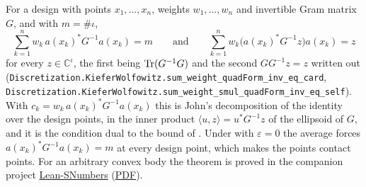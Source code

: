 \begin{remark}
\label{rem:identity-decomposition}
\leanok
{}
For a design with points $x_1, \dots, x_n$, weights $w_1, \dots, w_n$ and invertible Gram
matrix $G$, and with $m = \#\iota$,
\[
  \sum_{k=1}^n w_k \, a(x_k)^* G^{-1} a(x_k) = m
  \qquad \text{and} \qquad
  \sum_{k=1}^n w_k \bigl( a(x_k)^* G^{-1} z \bigr) a(x_k) = z
\]
for every $z \in \mathbb{C}^{\iota}$, the first being $\operatorname{Tr}(G^{-1} G)$ and the second
$G G^{-1} z = z$ written out
(\texttt{Discretization.KieferWolfowitz.sum\_weight\_quadForm\_inv\_eq\_card},
\texttt{Discretization.KieferWolfowitz.sum\_weight\_smul\_quadForm\_inv\_eq\_self}). With $c_k = w_k \, a(x_k)^* G^{-1} a(x_k)$ this is John's
decomposition of the identity over the design points, in the inner product
$\langle u, z \rangle = u^* G^{-1} z$ of the ellipsoid of $G$, and it is the condition
dual to the bound of . Under
 with $\varepsilon = 0$ the average forces
$a(x_k)^* G^{-1} a(x_k) = m$ at every design point, which makes the points contact
points. For an arbitrary convex body the theorem is proved in the companion project
\href{https://mario-ullrich.github.io/Lean-SNumbers/}{Lean-SNumbers}
(\href{https://mario-ullrich.github.io/Lean-SNumbers/blueprint.pdf}{PDF}).
\end{remark}

